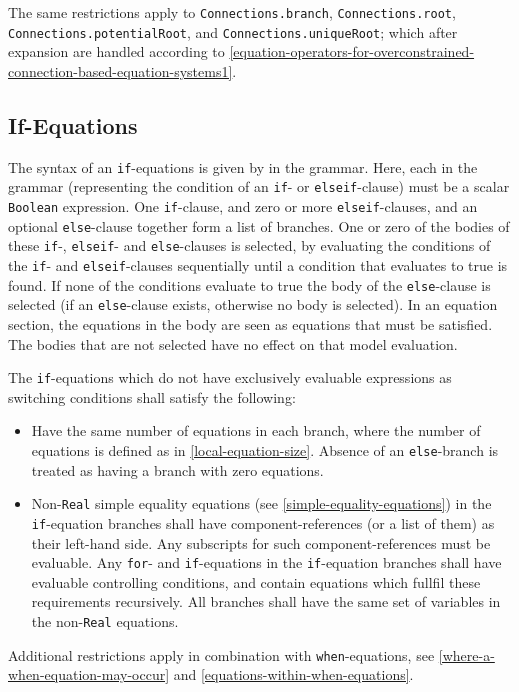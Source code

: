The same restrictions apply to \lstinline!Connections.branch!, \lstinline!Connections.root!, \lstinline!Connections.potentialRoot!, and \lstinline!Connections.uniqueRoot!; which after expansion are handled according to \cref{equation-operators-for-overconstrained-connection-based-equation-systems1}.


\subsection{If-Equations}\label{if-equations}

The syntax of an \lstinline!if!-equations is given by  in the grammar.
Here, each  in the grammar (representing the condition of an \lstinline!if!- or \lstinline!elseif!-clause) must be a scalar \lstinline!Boolean! expression.
One \lstinline!if!-clause, and zero or more \lstinline!elseif!-clauses, and an optional \lstinline!else!-clause together form a list of branches.
One or zero of the bodies of these \lstinline!if!-, \lstinline!elseif!- and \lstinline!else!-clauses is selected, by evaluating the conditions of the \lstinline!if!- and \lstinline!elseif!-clauses sequentially until a condition that evaluates to true is found.
If none of the conditions evaluate to true the body of the \lstinline!else!-clause is selected (if an \lstinline!else!-clause exists, otherwise no body is selected).
In an equation section, the equations in the body are seen as equations that must be satisfied.
The bodies that are not selected have no effect on that model evaluation.

The \lstinline!if!-equations which do not have exclusively evaluable expressions as switching conditions shall satisfy the following:
\begin{itemize}
\item
  Have the same number of equations in each branch, where the number of equations is defined as in \cref{local-equation-size}.
  Absence of an \lstinline!else!-branch is treated as having a branch with zero equations.
\item
  Non-\lstinline!Real! simple equality equations (see \cref{simple-equality-equations}) in the \lstinline!if!-equation branches shall have component-references (or a list of them) as their left-hand side.
  Any subscripts for such component-references must be evaluable.
  Any \lstinline!for!- and \lstinline!if!-equations in the \lstinline!if!-equation branches shall have evaluable controlling conditions, and contain equations which fullfil these requirements recursively.
  All branches shall have the same set of variables in the non-\lstinline!Real! equations.
\end{itemize}
Additional restrictions apply in combination with \lstinline!when!-equations, see \cref{where-a-when-equation-may-occur} and \cref{equations-within-when-equations}.

